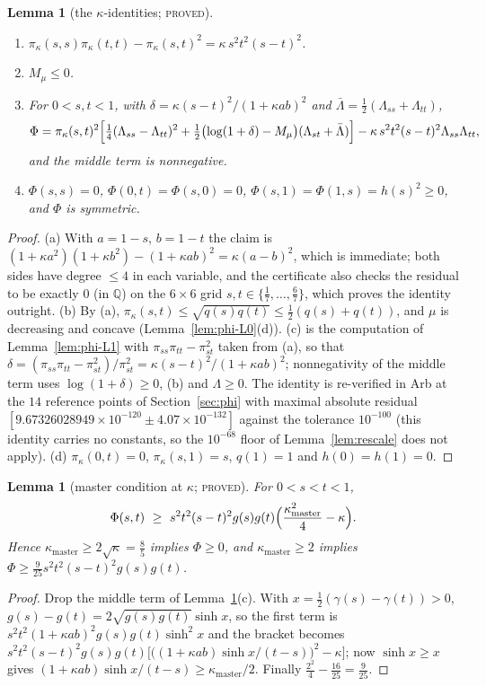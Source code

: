\documentclass[11pt]{article}
\theoremstyle{plain}
\newtheorem{lemma}[theorem]{Lemma}
\theoremstyle{definition}
\theoremstyle{remark}
\newcommand{\lbl}[1]{\textsc{#1}}
\begin{document}
\begin{lemma}[the $\kappa$-identities; \lbl{proved}]\label{lem:scaled-phi-id}
\leavevmode
\begin{enumerate}[label=(\alph*),nosep]
\item $\pi_\kappa(s,s)\pi_\kappa(t,t)-\pi_\kappa(s,t)^2=\kappa\,s^2t^2(s-t)^2$.
\item $M_\mu\le0$.
\item For $0<s,t<1$, with $\delta=\kappa(s-t)^2/(1+\kappa ab)^2$ and
$\bar\Lambda=\tfrac12(\Lambda_{ss}+\Lambda_{tt})$,
\[
  \Phi=\pi_\kappa(s,t)^2\Bigl[\tfrac14(\Lambda_{ss}-\Lambda_{tt})^2
  +\tfrac12\bigl(\log(1+\delta)-M_\mu\bigr)(\Lambda_{st}+\bar\Lambda)\Bigr]
  -\kappa\,s^2t^2(s-t)^2\Lambda_{ss}\Lambda_{tt},
\]
and the middle term is nonnegative.
\item $\Phi(s,s)=0$, $\Phi(0,t)=\Phi(s,0)=0$, $\Phi(s,1)=\Phi(1,s)=h(s)^2\ge0$,
and $\Phi$ is symmetric.
\end{enumerate}
\end{lemma}
\begin{proof}
(a) With $a=1-s$, $b=1-t$ the claim is
$(1+\kappa a^2)(1+\kappa b^2)-(1+\kappa ab)^2=\kappa(a-b)^2$, which is
immediate; both sides have degree $\le4$ in each variable, and the
certificate also checks the residual to be exactly $0$ (in $\mathbb Q$) on the
$6\times6$ grid $s,t\in\{\tfrac17,\dots,\tfrac67\}$, which proves the identity
outright.  (b) By (a), $\pi_\kappa(s,t)\le\sqrt{q(s)q(t)}\le\tfrac12(q(s)+q(t))$,
and $\mu$ is decreasing and concave (Lemma~\ref{lem:phi-L0}(d)).  (c) is the
computation of Lemma~\ref{lem:phi-L1} with $\pi_{ss}\pi_{tt}-\pi_{st}^2$ taken
from (a), so that
$\delta=(\pi_{ss}\pi_{tt}-\pi_{st}^2)/\pi_{st}^2=\kappa(s-t)^2/(1+\kappa ab)^2$;
nonnegativity of the middle term uses $\log(1+\delta)\ge0$, (b) and
$\Lambda\ge0$.  The identity is re-verified in Arb at the $14$ reference
points of Section~\ref{sec:phi} with maximal absolute residual
$[9.67326028949\times10^{-120}\pm4.07\times10^{-132}]$ against the tolerance
$10^{-100}$ (this identity carries no constants, so the $10^{-68}$ floor of
Lemma~\ref{lem:rescale} does not apply).  (d) $\pi_\kappa(0,t)=0$,
$\pi_\kappa(s,1)=s$, $q(1)=1$ and $h(0)=h(1)=0$.
\end{proof}

\begin{lemma}[master condition at $\kappa$; \lbl{proved}]\label{lem:scaled-master}
For $0<s<t<1$,
\[
  \Phi(s,t)\ \ge\ s^2t^2(s-t)^2g(s)g(t)\Bigl(\frac{\kappa_{\mathrm{master}}^2}4-\kappa\Bigr).
\]
Hence $\kappa_{\mathrm{master}}\ge2\sqrt\kappa=\tfrac85$ implies $\Phi\ge0$, and
$\kappa_{\mathrm{master}}\ge2$ implies
$\Phi\ge\tfrac9{25}s^2t^2(s-t)^2g(s)g(t)$.
\end{lemma}
\begin{proof}
Drop the middle term of Lemma~\ref{lem:scaled-phi-id}(c).  With
$x=\tfrac12(\gamma(s)-\gamma(t))>0$,
$g(s)-g(t)=2\sqrt{g(s)g(t)}\sinh x$, so the first term is
$s^2t^2(1+\kappa ab)^2g(s)g(t)\sinh^2x$ and the bracket becomes
$s^2t^2(s-t)^2g(s)g(t)\bigl[\bigl((1+\kappa ab)\sinh x/(t-s)\bigr)^2-\kappa\bigr]$;
now $\sinh x\ge x$ gives $(1+\kappa ab)\sinh x/(t-s)\ge\kappa_{\mathrm{master}}/2$.  Finally
$\tfrac{2^2}4-\tfrac{16}{25}=\tfrac9{25}$.
\end{proof}
\end{document}
